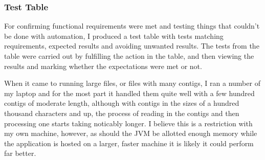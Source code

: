 \subsubsection{Test Table}
For confirming functional requirements were met and testing things that couldn't be done with automation, I produced a test table with tests matching requirements, expected results and avoiding unwanted results. The tests from the table were carried out by fulfilling the action in the table, and then viewing the results and marking whether the expectations were met or not.


When it came to running large files, or files with many contigs, I ran a number of my laptop and for the most part it handled them quite well with a few hundred contigs of moderate length, although with contigs in the sizes of a hundred thousand characters and up, the process of reading in the contigs and then processing one starts taking noticably longer. I believe this is a restriction with my own machine, however, as should the JVM be allotted enough memory while the application is hosted on a larger, faster machine it is likely it could perform far better.
